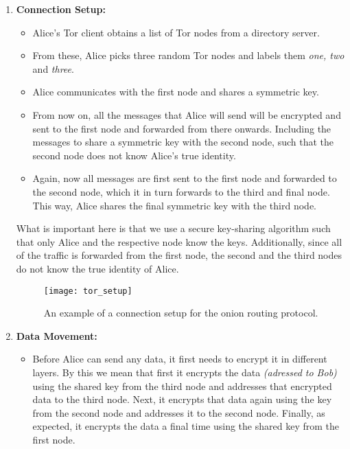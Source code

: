 \begin{enumerate}
  \item \textbf{Connection Setup:}
    \begin{itemize}
      \item Alice's Tor client obtains a list of Tor nodes from a directory server.
      \item From these, Alice picks three random Tor nodes and labels them \textit{one, two} and \textit{three}.
      \item Alice communicates with the first node and shares a symmetric key.
      \item From now on, all the messages that Alice will send will be encrypted and sent to the first node and forwarded from there onwards.
        Including the messages to share a symmetric key with the second node, such that the second node does not know Alice's true identity.
      \item Again, now all messages are first sent to the first node and forwarded to the second node, which it in turn forwards to the third and final node.
        This way, Alice shares the final symmetric key with the third node.
    \end{itemize}

    What is important here is that we use a secure key-sharing algorithm such that only Alice and the respective node know the keys.
    Additionally, since all of the traffic is forwarded from the first node, the second and the third nodes do not know the true identity of Alice.

    \begin{figure}[ht]
      \centering
      \texttt{[image: tor\_setup]}
      \caption{An example of a connection setup for the onion routing protocol.}
      \label{fig:tor_setup}
    \end{figure}

  \newpage

  \item \textbf{Data Movement:}
    \begin{itemize}
      \item Before Alice can send any data, it first needs to encrypt it in different layers. By this we mean that first it encrypts the data \textit{(adressed to Bob)}
        using the shared key from the third node and addresses that encrypted data to the third node.
        Next, it encrypts that data again using the key from the second node and addresses it to the second node.
        Finally, as expected, it encrypts the data a final time using the shared key from the first node.


\end{itemize}
\end{enumerate}

